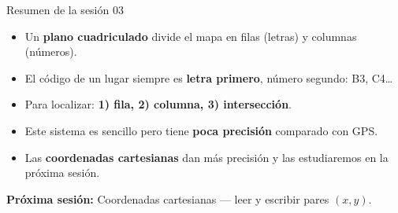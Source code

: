 \documentclass[aspectratio=169, 10pt, spanish]{beamer}
\begin{document}
\begin{frame}{Resumen de la sesión 03}
  \begin{resumenbox}
    \begin{itemize}
      \item Un \textbf{plano cuadriculado} divide el mapa en filas
            (letras) y columnas (números).
      \item El código de un lugar siempre es
            \textbf{letra primero}, número segundo: B3, C4\ldots
      \item Para localizar: \textbf{1) fila, 2) columna,
            3) intersección}.
      \item Este sistema es sencillo pero tiene
            \textbf{poca precisión} comparado con GPS.
      \item Las \textbf{coordenadas cartesianas} dan más precisión
            y las estudiaremos en la próxima sesión.
    \end{itemize}
  \end{resumenbox}
  \vspace{6pt}
  \begin{center}
    {\AlmFontSmall\color{AlmAzulM}
    \faArrowCircleRight\enskip
    \textbf{Próxima sesión:}
    Coordenadas cartesianas — leer y escribir pares $(x, y)$.}
  \end{center}
\end{frame}
\end{document}
